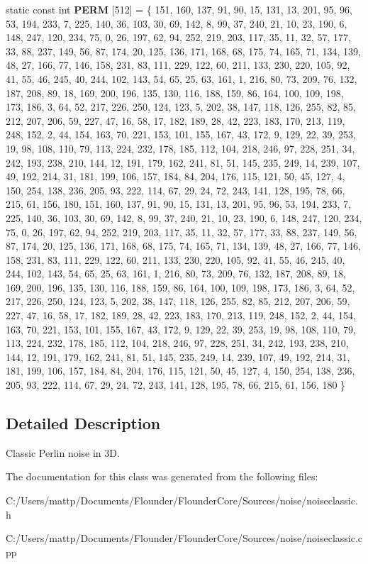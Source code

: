 \begin{DoxyCompactItemize}
static const int {\bfseries P\+E\+RM} \mbox{[}512\mbox{]} = \{ 151, 160, 137, 91, 90, 15, 131, 13, 201, 95, 96, 53, 194, 233, 7, 225, 140, 36, 103, 30, 69, 142, 8, 99, 37, 240, 21, 10, 23, 190, 6, 148, 247, 120, 234, 75, 0, 26, 197, 62, 94, 252, 219, 203, 117, 35, 11, 32, 57, 177, 33, 88, 237, 149, 56, 87, 174, 20, 125, 136, 171, 168, 68, 175, 74, 165, 71, 134, 139, 48, 27, 166, 77, 146, 158, 231, 83, 111, 229, 122, 60, 211, 133, 230, 220, 105, 92, 41, 55, 46, 245, 40, 244, 102, 143, 54, 65, 25, 63, 161, 1, 216, 80, 73, 209, 76, 132, 187, 208, 89, 18, 169, 200, 196, 135, 130, 116, 188, 159, 86, 164, 100, 109, 198, 173, 186, 3, 64, 52, 217, 226, 250, 124, 123, 5, 202, 38, 147, 118, 126, 255, 82, 85, 212, 207, 206, 59, 227, 47, 16, 58, 17, 182, 189, 28, 42, 223, 183, 170, 213, 119, 248, 152, 2, 44, 154, 163, 70, 221, 153, 101, 155, 167, 43, 172, 9, 129, 22, 39, 253, 19, 98, 108, 110, 79, 113, 224, 232, 178, 185, 112, 104, 218, 246, 97, 228, 251, 34, 242, 193, 238, 210, 144, 12, 191, 179, 162, 241, 81, 51, 145, 235, 249, 14, 239, 107, 49, 192, 214, 31, 181, 199, 106, 157, 184, 84, 204, 176, 115, 121, 50, 45, 127, 4, 150, 254, 138, 236, 205, 93, 222, 114, 67, 29, 24, 72, 243, 141, 128, 195, 78, 66, 215, 61, 156, 180, 151, 160, 137, 91, 90, 15, 131, 13, 201, 95, 96, 53, 194, 233, 7, 225, 140, 36, 103, 30, 69, 142, 8, 99, 37, 240, 21, 10, 23, 190, 6, 148, 247, 120, 234, 75, 0, 26, 197, 62, 94, 252, 219, 203, 117, 35, 11, 32, 57, 177, 33, 88, 237, 149, 56, 87, 174, 20, 125, 136, 171, 168, 68, 175, 74, 165, 71, 134, 139, 48, 27, 166, 77, 146, 158, 231, 83, 111, 229, 122, 60, 211, 133, 230, 220, 105, 92, 41, 55, 46, 245, 40, 244, 102, 143, 54, 65, 25, 63, 161, 1, 216, 80, 73, 209, 76, 132, 187, 208, 89, 18, 169, 200, 196, 135, 130, 116, 188, 159, 86, 164, 100, 109, 198, 173, 186, 3, 64, 52, 217, 226, 250, 124, 123, 5, 202, 38, 147, 118, 126, 255, 82, 85, 212, 207, 206, 59, 227, 47, 16, 58, 17, 182, 189, 28, 42, 223, 183, 170, 213, 119, 248, 152, 2, 44, 154, 163, 70, 221, 153, 101, 155, 167, 43, 172, 9, 129, 22, 39, 253, 19, 98, 108, 110, 79, 113, 224, 232, 178, 185, 112, 104, 218, 246, 97, 228, 251, 34, 242, 193, 238, 210, 144, 12, 191, 179, 162, 241, 81, 51, 145, 235, 249, 14, 239, 107, 49, 192, 214, 31, 181, 199, 106, 157, 184, 84, 204, 176, 115, 121, 50, 45, 127, 4, 150, 254, 138, 236, 205, 93, 222, 114, 67, 29, 24, 72, 243, 141, 128, 195, 78, 66, 215, 61, 156, 180 \}
\end{DoxyCompactItemize}


\subsection{Detailed Description}
Classic Perlin noise in 3D. 



The documentation for this class was generated from the following files\+:\begin{DoxyCompactItemize}
\item 
C\+:/\+Users/mattp/\+Documents/\+Flounder/\+Flounder\+Core/\+Sources/noise/noiseclassic.\+h\item 
C\+:/\+Users/mattp/\+Documents/\+Flounder/\+Flounder\+Core/\+Sources/noise/noiseclassic.\+cpp\end{DoxyCompactItemize}
